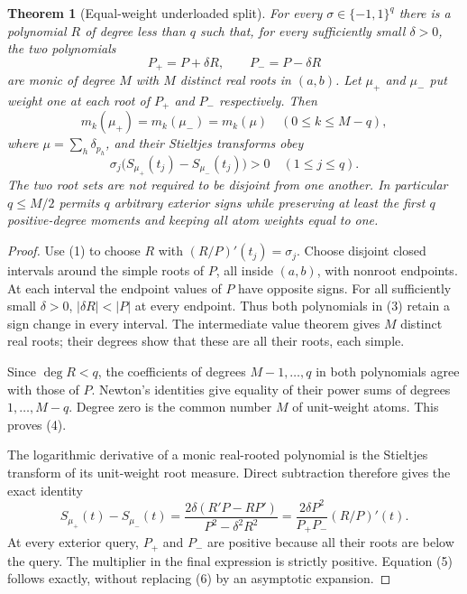 \documentclass[11pt]{article}
\newtheorem{theorem}{Theorem}
\begin{document}
\begin{theorem}[Equal-weight underloaded split]
For every $\sigma\in\{-1,1\}^q$ there is a polynomial $R$ of degree
less than $q$ such that, for every sufficiently small $\delta>0$, the
two polynomials
\[
                       P_+=P+\delta R,\qquad P_-=P-\delta R
                                                               \tag{3}
\]
are monic of degree $M$ with $M$ distinct real roots in $(a,b)$.
Let $\mu_+$ and $\mu_-$ put weight one at each root of $P_+$ and
$P_-$ respectively. Then
\[
 m_k(\mu_+)=m_k(\mu_-)=m_k(\mu)
              \quad(0\leq k\leq M-q),                       \tag{4}
\]
where $\mu=\sum_h\delta_{p_h}$, and their Stieltjes transforms obey
\[
 \sigma_j\bigl(S_{\mu_+}(t_j)-S_{\mu_-}(t_j)\bigr)>0
                 \quad(1\leq j\leq q).                      \tag{5}
\]
The two root sets are not required to be disjoint from one another.
In particular $q\leq M/2$ permits $q$ arbitrary exterior signs while
preserving at least the first $q$ positive-degree moments and keeping
all atom weights equal to one.
\end{theorem}
\begin{proof}
Use (1) to choose $R$ with $(R/P)'(t_j)=\sigma_j$.
Choose disjoint closed intervals around the simple roots of $P$,
all inside $(a,b)$, with nonroot endpoints. At each interval the
endpoint values of $P$ have opposite signs. For all sufficiently
small $\delta>0$, $|\delta R|<|P|$ at every endpoint. Thus both
polynomials in (3) retain a sign change in every interval. The
intermediate value theorem gives $M$ distinct real roots; their
degrees show that these are all their roots, each simple.

Since $\deg R<q$, the coefficients of degrees $M-1,\ldots,q$ in
both polynomials agree with those of $P$. Newton's identities give
equality of their power sums of degrees $1,\ldots,M-q$. Degree
zero is the common number $M$ of unit-weight atoms. This proves (4).

The logarithmic derivative of a monic real-rooted polynomial is the
Stieltjes transform of its unit-weight root measure. Direct subtraction
therefore gives the exact identity
\[
 S_{\mu_+}(t)-S_{\mu_-}(t)
 =\frac{2\delta(R'P-RP')}{P^2-\delta^2R^2}
 =\frac{2\delta P^2}{P_+P_-}(R/P)'(t).                    \tag{6}
\]
At every exterior query, $P_+$ and $P_-$ are positive because all
their roots are below the query. The multiplier in the final
expression is strictly positive. Equation (5) follows exactly,
without replacing (6) by an asymptotic expansion.
\end{proof}
\end{document}
